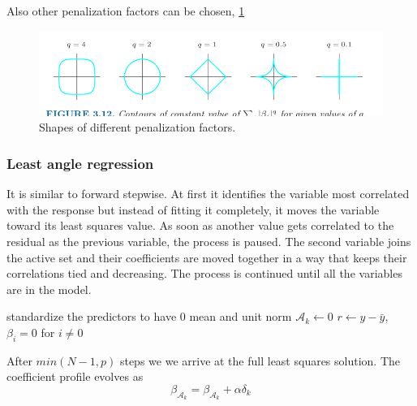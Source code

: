 \documentclass[12pt, letterpaper]{article}
\theoremstyle{definition}
\begin{document}
Also other penalization factors can be chosen, \ref{penalization}

\begin{figure}
\centering
\includegraphics[scale=0.4]{img/penalization}
\caption{Shapes of different penalization factors.}
\label{penalization}
\end{figure}

\subsubsection{Least angle regression}
It is similar to forward stepwise. At first it identifies the variable most correlated with the response but instead of fitting it completely, it moves the variable toward its least squares value. As soon as another value gets correlated to the residual as the previous variable, the process is paused. The second variable joins the active set and their coefficients are moved together in a way that keeps their correlations tied and decreasing. The process is continued until all the variables are in the model.
\begin{algorithm}[!ht]
standardize the predictors to have $0$ mean and unit norm\;
$\mathcal{A}_k\leftarrow 0$\;
$r\leftarrow y-\bar{y}$, $\beta_i=0$ for $i\ne0$\;
\end{algorithm}
After $min(N-1,p)$ steps we we arrive at the full least squares solution.
The coefficient profile evolves as
\begin{equation}
\beta_{\mathcal{A}_k} =  \beta_{\mathcal{A}_k} + \alpha \delta_k
\end{equation}
\end{document}
